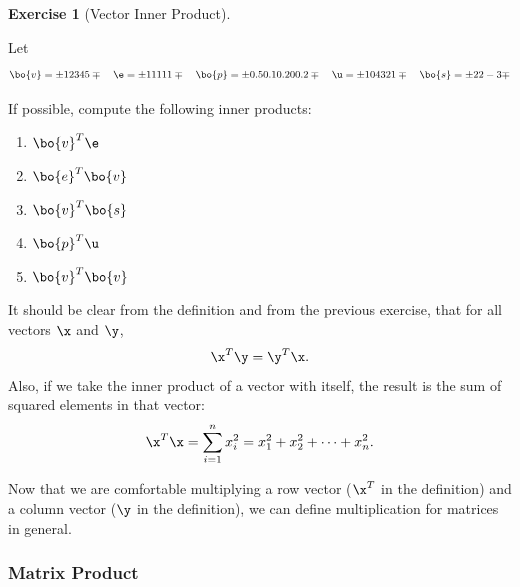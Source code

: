 \documentclass[
]{article}
\providecommand{\tightlist}{%
  \setlength{\itemsep}{0pt}\setlength{\parskip}{0pt}}
\theoremstyle{definition}
\theoremstyle{definition}
\theoremstyle{definition}
\newtheorem{exercise}{Exercise}[section]
\theoremstyle{definition}
\theoremstyle{remark}
\begin{document}
\begin{exercise}[Vector Inner Product]
\protect\hypertarget{exr:innerprodexer}{}\label{exr:innerprodexer}

Let \[\bo{v}=\pm 1 \\2\\3\\4\\5 \mp \quad \e=\pm 1 \\1\\1\\1\\1 \mp \quad \bo{p}=\pm 0.5 \\0.1\\0.2\\0\\0.2 \mp \quad \u= \pm 10\\4\\3\\2\\1 \mp \quad \bo{s} = \pm 2\\2\\-3 \mp\]

If possible, compute the following inner products:

\begin{enumerate}
\def\labelenumi{\alph{enumi}.}
\tightlist
\item
  \(\bo{v}^T\e\)
\item
  \(\bo{e}^T\bo{v}\)
\item
  \(\bo{v}^T\bo{s}\)
\item
  \(\bo{p}^T\u\)
\item
  \(\bo{v}^T\bo{v}\)
\end{enumerate}

\end{exercise}

It should be clear from the definition and from the previous exercise, that for all vectors \(\x\) and \(\y\),
\[\x^T\y = \y^T\x.\]
Also, if we take the inner product of a vector with itself, the result is the sum of squared elements in that vector:
\[\x^T\x = \sum_{i=1}^n x_i^2 = x_1^2 + x_2^2+ \dots + x_n^2.\]

Now that we are comfortable multiplying a row vector (\(\x^T\) in the definition) and a column vector (\(\y\) in the definition), we can define multiplication for matrices in general.

\hypertarget{matrix-product}{%
\subsubsection{Matrix Product}\label{matrix-product}}
\end{document}
